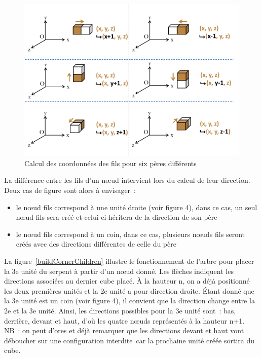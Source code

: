 \begin{figure}[h]
 \centering
 \includegraphics[scale=0.5,keepaspectratio=true]{img/buildChildren.png}
 \caption{Calcul des coordonnées des fils pour six pères différents}
 \label{buildChildren}
\end{figure}

La différence entre les fils d’un nœud intervient lors du calcul de leur direction. Deux cas de figure sont alors à envisager :
\begin{itemize}
 \item le nœud fils correspond à une unité droite (voir figure 4), dans ce cas, un seul nœud fils sera créé et celui-ci héritera de la direction de son père
 \item le nœud fils correspond à un coin, dans ce cas, plusieurs nœuds fils seront créés avec des directions différentes de celle du père
\end{itemize}
 
La figure~\ref{buildCornerChildren} illustre le fonctionnement de l’arbre pour placer la 3e unité du serpent à partir d’un nœud donné. Les flèches indiquent les directions associées au dernier cube placé. À la hauteur n, on a déjà positionné les deux premières unités et la 2e unité a pour direction droite.  Étant donné que la 3e unité est un coin (voir figure 4), il convient que la direction change entre la 2e et la 3e unité. Ainsi, les directions possibles pour la 3e unité sont : bas, derrière, devant et haut, d’où les quatre nœuds représentés à la hauteur n+1. 
NB : on peut d’ores et déjà remarquer que les directions devant et haut vont déboucher sur une configuration interdite car la prochaine unité créée sortira du cube.

